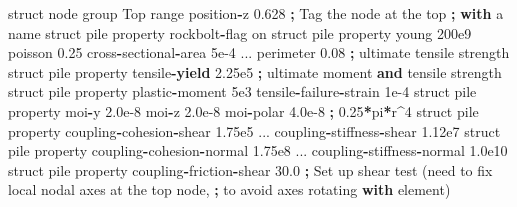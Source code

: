 \documentclass[a4paper, nobind]{templates/ociamthesis}
\newenvironment{Shaded}{\begin{snugshade}}{\end{snugshade}}
\newcommand{\BuiltInTok}[1]{#1}
\newcommand{\ControlFlowTok}[1]{\textcolor[rgb]{0.13,0.29,0.53}{\textbf{#1}}}
\newcommand{\DecValTok}[1]{\textcolor[rgb]{0.00,0.00,0.81}{#1}}
\newcommand{\FloatTok}[1]{\textcolor[rgb]{0.00,0.00,0.81}{#1}}
\newcommand{\KeywordTok}[1]{\textcolor[rgb]{0.13,0.29,0.53}{\textbf{#1}}}
\newcommand{\NormalTok}[1]{#1}
\newcommand{\OperatorTok}[1]{\textcolor[rgb]{0.81,0.36,0.00}{\textbf{#1}}}
\newcommand{\StringTok}[1]{\textcolor[rgb]{0.31,0.60,0.02}{#1}}
\renewenvironment{Shaded}
{
  \vspace{10pt}%
  \begin{snugshade}%
}{%
  \end{snugshade}%
  \vspace{8pt}%
}
\begin{document}
\begin{Shaded}
\begin{Highlighting}[]
\NormalTok{    struct node group }\StringTok{\textquotesingle{}Top\textquotesingle{}} \BuiltInTok{range}\NormalTok{ position}\OperatorTok{{-}}\NormalTok{z }\FloatTok{0.628} \OperatorTok{;}\NormalTok{ Tag the node at the top}
                                                   \OperatorTok{;} \ControlFlowTok{with}\NormalTok{ a name}
\NormalTok{    struct pile }\BuiltInTok{property}\NormalTok{ rockbolt}\OperatorTok{{-}}\NormalTok{flag on}
\NormalTok{    struct pile }\BuiltInTok{property}\NormalTok{ young }\FloatTok{200e9}\NormalTok{ poisson }\FloatTok{0.25}\NormalTok{ cross}\OperatorTok{{-}}\NormalTok{sectional}\OperatorTok{{-}}\NormalTok{area }\FloatTok{5e{-}4}\NormalTok{ ...}
\NormalTok{                         perimeter }\FloatTok{0.08}
    \OperatorTok{;}\NormalTok{ ultimate tensile strength}
\NormalTok{    struct pile }\BuiltInTok{property}\NormalTok{ tensile}\OperatorTok{{-}}\ControlFlowTok{yield}   \FloatTok{2.25e5}
    \OperatorTok{;}\NormalTok{ ultimate moment }\KeywordTok{and}\NormalTok{ tensile strength}
\NormalTok{    struct pile }\BuiltInTok{property}\NormalTok{ plastic}\OperatorTok{{-}}\NormalTok{moment   }\FloatTok{5e3}\NormalTok{ tensile}\OperatorTok{{-}}\NormalTok{failure}\OperatorTok{{-}}\NormalTok{strain   }\FloatTok{1e{-}4}
\NormalTok{    struct pile }\BuiltInTok{property}\NormalTok{ moi}\OperatorTok{{-}}\NormalTok{y }\FloatTok{2.0e{-}8}\NormalTok{ moi}\OperatorTok{{-}}\NormalTok{z }\FloatTok{2.0e{-}8}\NormalTok{ moi}\OperatorTok{{-}}\NormalTok{polar }\FloatTok{4.0e{-}8}
    \OperatorTok{;}                        \FloatTok{0.25}\OperatorTok{*}\NormalTok{pi}\OperatorTok{*}\NormalTok{r}\OperatorTok{\^{}}\DecValTok{4}
\NormalTok{    struct pile }\BuiltInTok{property}\NormalTok{ coupling}\OperatorTok{{-}}\NormalTok{cohesion}\OperatorTok{{-}}\NormalTok{shear }\FloatTok{1.75e5}\NormalTok{ ...}
\NormalTok{                         coupling}\OperatorTok{{-}}\NormalTok{stiffness}\OperatorTok{{-}}\NormalTok{shear }\FloatTok{1.12e7}
\NormalTok{    struct pile }\BuiltInTok{property}\NormalTok{ coupling}\OperatorTok{{-}}\NormalTok{cohesion}\OperatorTok{{-}}\NormalTok{normal }\FloatTok{1.75e8}\NormalTok{ ... }
\NormalTok{                         coupling}\OperatorTok{{-}}\NormalTok{stiffness}\OperatorTok{{-}}\NormalTok{normal }\FloatTok{1.0e10}
\NormalTok{    struct pile }\BuiltInTok{property}\NormalTok{ coupling}\OperatorTok{{-}}\NormalTok{friction}\OperatorTok{{-}}\NormalTok{shear }\FloatTok{30.0}
    \OperatorTok{;}\NormalTok{ Set up shear test (need to fix local nodal axes at the top node, }
    \OperatorTok{;}\NormalTok{ to avoid axes rotating }\ControlFlowTok{with}\NormalTok{ element)}

\end{Highlighting}
\end{Shaded}
\end{document}

